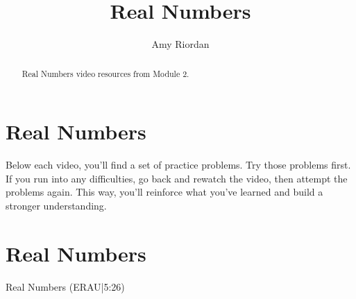 \documentclass{ximera}
\title{Real Numbers}
\author{Amy Riordan}
\begin{document}
\begin{abstract}
Real Numbers video resources from Module 2.
\end{abstract}
\maketitle

\section*{Real Numbers}

Below each video, you’ll find a set of practice problems. Try those problems first. If you run into any difficulties, go back and rewatch the video, then attempt the problems again. This way, you’ll reinforce what you’ve learned and build a stronger understanding.

\section*{Real Numbers}

Real Numbers (ERAU|5:26)
\end{document}
